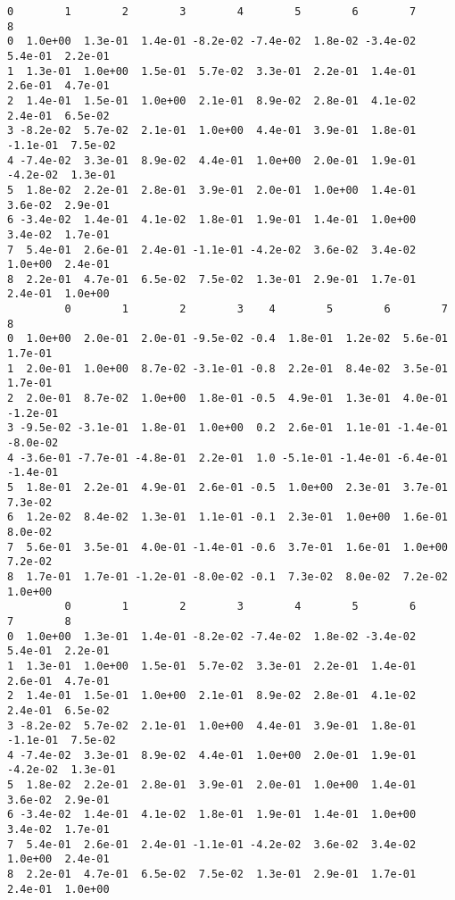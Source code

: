 \documentclass[11pt]{article}
\begin{document}
    \begin{Verbatim}[commandchars=\\\{\}]
         0        1        2        3        4        5        6        7        8
0  1.0e+00  1.3e-01  1.4e-01 -8.2e-02 -7.4e-02  1.8e-02 -3.4e-02  5.4e-01  2.2e-01
1  1.3e-01  1.0e+00  1.5e-01  5.7e-02  3.3e-01  2.2e-01  1.4e-01  2.6e-01  4.7e-01
2  1.4e-01  1.5e-01  1.0e+00  2.1e-01  8.9e-02  2.8e-01  4.1e-02  2.4e-01  6.5e-02
3 -8.2e-02  5.7e-02  2.1e-01  1.0e+00  4.4e-01  3.9e-01  1.8e-01 -1.1e-01  7.5e-02
4 -7.4e-02  3.3e-01  8.9e-02  4.4e-01  1.0e+00  2.0e-01  1.9e-01 -4.2e-02  1.3e-01
5  1.8e-02  2.2e-01  2.8e-01  3.9e-01  2.0e-01  1.0e+00  1.4e-01  3.6e-02  2.9e-01
6 -3.4e-02  1.4e-01  4.1e-02  1.8e-01  1.9e-01  1.4e-01  1.0e+00  3.4e-02  1.7e-01
7  5.4e-01  2.6e-01  2.4e-01 -1.1e-01 -4.2e-02  3.6e-02  3.4e-02  1.0e+00  2.4e-01
8  2.2e-01  4.7e-01  6.5e-02  7.5e-02  1.3e-01  2.9e-01  1.7e-01  2.4e-01  1.0e+00
         0        1        2        3    4        5        6        7        8
0  1.0e+00  2.0e-01  2.0e-01 -9.5e-02 -0.4  1.8e-01  1.2e-02  5.6e-01  1.7e-01
1  2.0e-01  1.0e+00  8.7e-02 -3.1e-01 -0.8  2.2e-01  8.4e-02  3.5e-01  1.7e-01
2  2.0e-01  8.7e-02  1.0e+00  1.8e-01 -0.5  4.9e-01  1.3e-01  4.0e-01 -1.2e-01
3 -9.5e-02 -3.1e-01  1.8e-01  1.0e+00  0.2  2.6e-01  1.1e-01 -1.4e-01 -8.0e-02
4 -3.6e-01 -7.7e-01 -4.8e-01  2.2e-01  1.0 -5.1e-01 -1.4e-01 -6.4e-01 -1.4e-01
5  1.8e-01  2.2e-01  4.9e-01  2.6e-01 -0.5  1.0e+00  2.3e-01  3.7e-01  7.3e-02
6  1.2e-02  8.4e-02  1.3e-01  1.1e-01 -0.1  2.3e-01  1.0e+00  1.6e-01  8.0e-02
7  5.6e-01  3.5e-01  4.0e-01 -1.4e-01 -0.6  3.7e-01  1.6e-01  1.0e+00  7.2e-02
8  1.7e-01  1.7e-01 -1.2e-01 -8.0e-02 -0.1  7.3e-02  8.0e-02  7.2e-02  1.0e+00
         0        1        2        3        4        5        6        7        8
0  1.0e+00  1.3e-01  1.4e-01 -8.2e-02 -7.4e-02  1.8e-02 -3.4e-02  5.4e-01  2.2e-01
1  1.3e-01  1.0e+00  1.5e-01  5.7e-02  3.3e-01  2.2e-01  1.4e-01  2.6e-01  4.7e-01
2  1.4e-01  1.5e-01  1.0e+00  2.1e-01  8.9e-02  2.8e-01  4.1e-02  2.4e-01  6.5e-02
3 -8.2e-02  5.7e-02  2.1e-01  1.0e+00  4.4e-01  3.9e-01  1.8e-01 -1.1e-01  7.5e-02
4 -7.4e-02  3.3e-01  8.9e-02  4.4e-01  1.0e+00  2.0e-01  1.9e-01 -4.2e-02  1.3e-01
5  1.8e-02  2.2e-01  2.8e-01  3.9e-01  2.0e-01  1.0e+00  1.4e-01  3.6e-02  2.9e-01
6 -3.4e-02  1.4e-01  4.1e-02  1.8e-01  1.9e-01  1.4e-01  1.0e+00  3.4e-02  1.7e-01
7  5.4e-01  2.6e-01  2.4e-01 -1.1e-01 -4.2e-02  3.6e-02  3.4e-02  1.0e+00  2.4e-01
8  2.2e-01  4.7e-01  6.5e-02  7.5e-02  1.3e-01  2.9e-01  1.7e-01  2.4e-01  1.0e+00

    \end{Verbatim}
\end{document}
